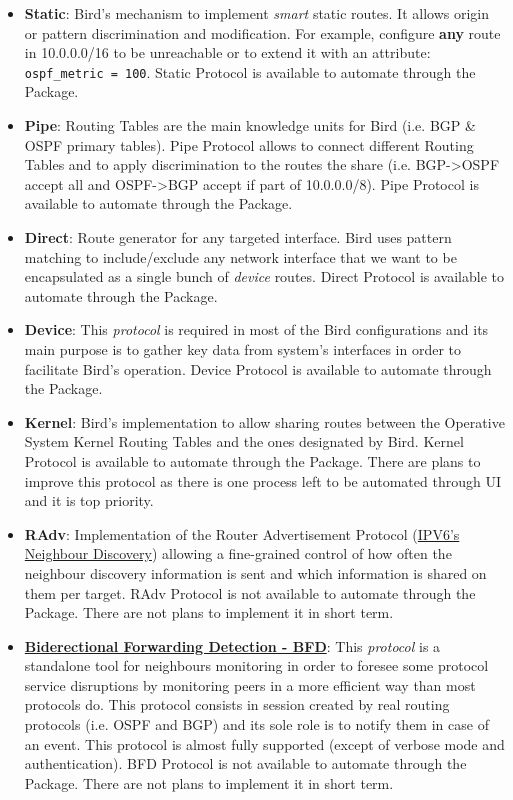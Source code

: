 \begin{itemize}
    \item \textbf{Static}: Bird's mechanism to implement \textit{smart} static routes. It allows  origin or pattern discrimination and modification. For example, configure \textbf{any} route in 10.0.0.0/16 to be unreachable or to extend it with an attribute: \texttt{ospf\_metric = 100}.
    Static Protocol is available to automate through the Package.
    \item \textbf{Pipe}: Routing Tables are the main knowledge units for Bird (i.e. BGP \& OSPF primary tables). Pipe Protocol allows to connect different Routing Tables and to apply discrimination to the routes the share (i.e. BGP->OSPF accept all and OSPF->BGP accept if part of 10.0.0.0/8).
    Pipe Protocol is available to automate through the Package.
    \item \textbf{Direct}: Route generator for any targeted interface. Bird uses pattern matching to include/exclude any network interface that we want to be encapsulated as a single bunch of \textit{device} routes.
    Direct Protocol is available to automate through the Package.
    \item \textbf{Device}: This \textit{protocol} is required in most of the Bird configurations and its main purpose is to gather key data from system's interfaces in order to facilitate Bird's operation.
    Device Protocol is available to automate through the Package.
    \item \textbf{Kernel}: Bird's implementation to allow sharing routes between the Operative System Kernel Routing Tables and the ones designated by Bird.
    Kernel Protocol is available to automate through the Package. There are plans to improve this protocol as there is one process left to be automated through UI and it is top priority.
    \item \textbf{RAdv}: Implementation of the Router Advertisement Protocol (\href{https://tools.ietf.org/html/rfc4861}{IPV6's Neighbour Discovery}) allowing a fine-grained control of how often the neighbour discovery information is sent and which information is shared on them per target.
    RAdv Protocol is not available to automate through the Package. There are not plans to implement it in short term.
    \item \textbf{\href{https://www.rfc-editor.org/rfc/rfc5880.txt}{Biderectional Forwarding Detection - BFD}}: This \textit{protocol} is a standalone tool for neighbours monitoring in order to foresee some protocol service disruptions by monitoring peers in a more efficient way than most protocols do. This protocol consists in session created by real routing protocols (i.e. OSPF and BGP) and its sole role is to notify them in case of an event. This protocol is almost fully supported (except of verbose mode and authentication).
    BFD Protocol is not available to automate through the Package. There are not plans to implement it in short term.
\end{itemize}


